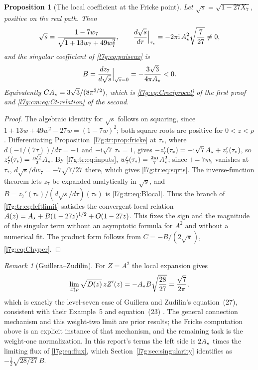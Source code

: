 \documentclass[11pt,letterpaper]{article}
\newtheorem{proposition}[theorem]{Proposition}
\theoremstyle{remark}\newtheorem{remark}[theorem]{Remark}
\newcommand{\ii}{\mathrm i}\newcommand{\ee}{\mathrm e}
\newcounter{l7gtrsavedeq}
\begin{document}
\begin{proposition}[The local coefficient at the Fricke point]\label{l7g:tr:prop:local}
Let $\sqrt s=\sqrt{1-27X_7}$, positive on the real path. Then
\begin{equation}\label{l7g:tr:eq:sqrts}
 \sqrt s=\frac{1-7w_7}{\sqrt{1+13w_7+49w_7^2}},\qquad
 \frac{d\sqrt s}{d\tau}\Big|_{\tau_*}=-2\pi\ii\,\Ast^2\sqrt{\frac7{27}}\ne0,
\end{equation}
and the singular coefficient of \eqref{l7g:eq:puiseux} is
\begin{equation}\label{l7g:tr:eq:Blocal}
 B=\frac{dz_7}{d\sqrt s}\Big|_{\sqrt s=0}=-\frac{3\sqrt3}{4\pi A_\star}<0 .
\end{equation}
Equivalently $CA_\star=3\sqrt3/(8\pi^{3/2})$, which is \eqref{l7g:eq:Creciprocal}
of the first proof and \eqref{l7g:cm:eq:Ct-relation} of the second.
\end{proposition}
\begin{proof}
The algebraic identity for $\sqrt s$ follows on squaring, since
$1+13w+49w^2-27w=(1-7w)^2$; both square roots are positive for
$0<z<\rho$. Differentiating Proposition~\ref{l7g:tr:prop:fricke} at
$\tau_*$, where $d(-1/(7\tau))/d\tau=-1$ and $-\ii\sqrt7\,\tau_*=1$, gives
$-z_7'(\tau_*)=-\ii\sqrt7\,\Ast+z_7'(\tau_*)$, so
$z_7'(\tau_*)=\tfrac{\ii\sqrt7}2\Ast$. By \eqref{l7g:tr:eq:inputs},
$w_7'(\tau_*)=\tfrac{2\pi\ii}7\Ast^2$; since $1-7w_7$ vanishes at $\tau_*$,
$d\sqrt s/dw_7=-7\sqrt{7/27}$ there, which gives \eqref{l7g:tr:eq:sqrts}. The
inverse-function theorem lets $z_7$ be expanded analytically in $\sqrt s$,
and $B=z_7'(\tau_*)/(d\sqrt s/d\tau)(\tau_*)$ is \eqref{l7g:tr:eq:Blocal}.
Thus the branch of \eqref{l7g:tr:eq:leftlimit} satisfies the convergent
local relation $A(z)=A_\star+B(1-27z)^{1/2}+O(1-27z)$. This fixes the sign and
the magnitude of the singular term without an asymptotic formula for $A^2$
and without a numerical fit. The product form follows from
$C=-B/(2\sqrt\pi)$, \eqref{l7g:eq:Chyper}.
\end{proof}

\begin{remark}[Guillera--Zudilin]\label{l7g:tr:rem:gz}
For $Z=A^2$ the local expansion gives
\begin{equation}\label{l7g:tr:eq:GZ}
 \lim_{z\uparrow\rho}\sqrt{D(z)}\,zZ'(z)=-A_\star B\sqrt{\frac{28}{27}}
 =\frac{\sqrt7}{2\pi},
\end{equation}
which is exactly the level-seven case of Guillera and Zudilin's
equation~(27), consistent with their Example~5 and equation~(23)
\cite{l7g:tr:gz}. The general connection mechanism and this weight-two
limit are prior results; the Fricke computation above is an explicit
instance of that mechanism, and the remaining task is the weight-one
normalization. In this report's terms the left side is $2A_\star$ times the
limiting flux of \eqref{l7g:eq:flux}, which Section~\ref{l7g:sec:singularity}
identifies as $-\tfrac12\sqrt{28/27}\,B$.
\end{remark}
\end{document}
